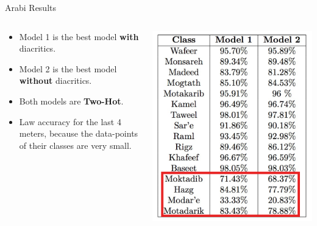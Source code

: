 \documentclass[10pt]{beamer}
\begin{document}
\begin{frame}[fragile]{Arabi Results}
\begin{columns}
\begin{column}{0.7\textwidth}
\begin{itemize}
    \item Model 1 is the best model \textbf{with } diacritics.
    \item Model 2 is the best model \textbf{without} diacritics.
    \item Both models are \textbf{Two-Hot}.
    \item Law accuracy for the last 4 meters, because the data-points of their
classes are very small.
\end{itemize}
\end{column}
\begin{column}{0.5\textwidth}
\includegraphics[scale=0.4]{fig5.png}
\end{column}
\end{columns}
\end{frame}
\end{document}
